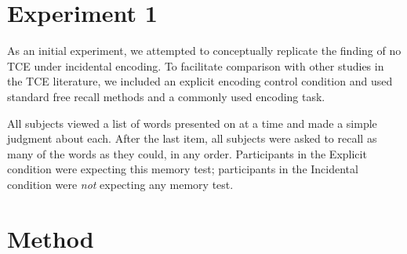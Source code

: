 \documentclass[jou,natbib,floatsintext]{apa6} %
\begin{document}


\section{Experiment 1}

As an initial experiment, we attempted to conceptually replicate the \citet{NairEtal17} finding of no TCE under incidental encoding. To facilitate comparison with other studies in the TCE literature, we included an explicit encoding control condition and used standard free recall methods and a commonly used encoding task. 

All subjects viewed a list of words presented on at a time and made a simple judgment about each. After the last item, all subjects were asked to recall as many of the words as they could, in any order. Participants in the Explicit condition were expecting this memory test; participants in the Incidental condition were \emph{not} expecting any memory test. 

\section{Method}

\newcommand\listlength{16} %
\newcommand\presrate{4 seconds} %
\newcommand\isi{1 second} %
\newcommand\DFRDelay{16 second} %
\newcommand\recalltime{75 seconds} %
\newcommand\totalss{XX}
\newcommand\totalexcluded{XX}
\end{document}
